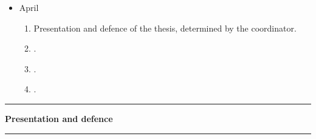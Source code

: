 \begin{itemize}
    \item April
        \begin{enumerate}
            \item Presentation and defence of the thesis, determined by the coordinator.
            \item .
            \item .
            \item .
        \end{enumerate}
\end{itemize}

\noindent\rule{\textwidth}{0.4pt}
\centerline{\textbf{Presentation and defence}}
\noindent\rule{\textwidth}{0.4pt}




